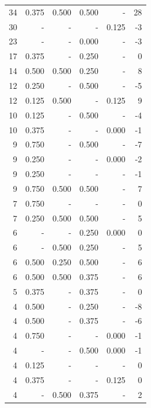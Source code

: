 \documentclass[a4paper]{article}\usepackage{graphicx, color}
\begin{document}
\begin{table}[ht]
\begin{tabular}{rrrrrr}
   \rowcolor{goodColor} 34 & 0.375 & 0.500 & 0.500 & - & 28 \\ 
   \rowcolor{nullColor} 30 & - & - & - & 0.125 & -3 \\ 
   \rowcolor{sosoColor} 23 & - & - & 0.000 & - & -3 \\ 
   \rowcolor{sosoColor} 17 & 0.375 & - & 0.250 & - & 0 \\ 
   \rowcolor{badColor} 14 & 0.500 & 0.500 & 0.250 & - & 8 \\ 
   \rowcolor{sosoColor} 12 & 0.250 & - & 0.500 & - & -5 \\ 
  12 & 0.125 & 0.500 & - & 0.125 & 9 \\ 
   \rowcolor{sosoColor} 10 & 0.125 & - & 0.500 & - & -4 \\ 
   \rowcolor{nullColor} 10 & 0.375 & - & - & 0.000 & -1 \\ 
   \rowcolor{sosoColor} 9 & 0.750 & - & 0.500 & - & -7 \\ 
   \rowcolor{nullColor} 9 & 0.250 & - & - & 0.000 & -2 \\ 
   \rowcolor{nullColor} 9 & 0.250 & - & - & - & -1 \\ 
   \rowcolor{goodColor} 9 & 0.750 & 0.500 & 0.500 & - & 7 \\ 
   \rowcolor{nullColor} 7 & 0.750 & - & - & - & 0 \\ 
   \rowcolor{goodColor} 7 & 0.250 & 0.500 & 0.500 & - & 5 \\ 
   \rowcolor{sosoColor} 6 & - & - & 0.250 & 0.000 & 0 \\ 
   \rowcolor{badColor} 6 & - & 0.500 & 0.250 & - & 5 \\ 
   \rowcolor{badColor} 6 & 0.500 & 0.250 & 0.500 & - & 6 \\ 
  6 & 0.500 & 0.500 & 0.375 & - & 6 \\ 
   \rowcolor{sosoColor} 5 & 0.375 & - & 0.375 & - & 0 \\ 
   \rowcolor{sosoColor} 4 & 0.500 & - & 0.250 & - & -8 \\ 
   \rowcolor{sosoColor} 4 & 0.500 & - & 0.375 & - & -6 \\ 
   \rowcolor{nullColor} 4 & 0.750 & - & - & 0.000 & -1 \\ 
   \rowcolor{sosoColor} 4 & - & - & 0.500 & 0.000 & -1 \\ 
   \rowcolor{nullColor} 4 & 0.125 & - & - & - & 0 \\ 
   \rowcolor{nullColor} 4 & 0.375 & - & - & 0.125 & 0 \\ 
  4 & - & 0.500 & 0.375 & - & 2 \\ 

\end{tabular}
\end{table}
\end{document}
